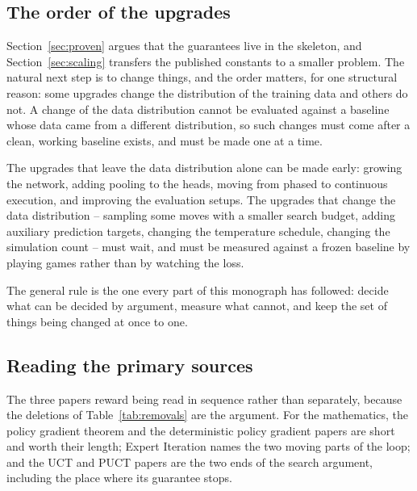 \subsection{The order of the upgrades}

Section~\ref{sec:proven} argues that the guarantees live in the skeleton, and
Section~\ref{sec:scaling} transfers the published constants to a smaller problem.
The natural next step is to change things, and the order matters, for one
structural reason: some upgrades change the distribution of the training data and
others do not. A change of the data distribution cannot be evaluated against a
baseline whose data came from a different distribution, so such changes must come
after a clean, working baseline exists, and must be made one at a time.

The upgrades that leave the data distribution alone can be made early: growing
the network, adding pooling to the heads, moving from phased to continuous
execution, and improving the evaluation setups. The upgrades that change the data
distribution -- sampling some moves with a smaller search budget, adding
auxiliary prediction targets, changing the temperature schedule, changing the
simulation count -- must wait, and must be measured against a frozen baseline by
playing games rather than by watching the loss.

The general rule is the one every part of this monograph has followed: decide
what can be decided by argument, measure what cannot, and keep the set of things
being changed at once to one.

\subsection{Reading the primary sources}

The three papers reward being read in sequence rather than separately, because
the deletions of Table~\ref{tab:removals} are the argument. For the
mathematics, the policy gradient theorem and the deterministic policy gradient
papers are short and worth their length; Expert Iteration names the two moving
parts of the loop; and the UCT and PUCT papers are the two ends of the search
argument, including the place where its guarantee stops.
